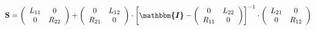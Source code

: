 \[ \mathbf{S} = \left(\begin{array}{cc} L_{11} & 0 \\ 0 & R_{22}
\end{array}\right) + \left(\begin{array}{cc} 0 & L_{12} \\ R_{21} & 0
\end{array}\right) \cdot \left[ \boldsymbol{\mathbbm{I}}  -
\left(\begin{array}{cc} 0 & L_{22} \\ R_{11} & 0 \end{array}\right)
\right]^{-1} \cdot\left(\begin{array}{cc} L_{21} & 0 \\ 0 & R_{12}
\end{array}\right) \]
